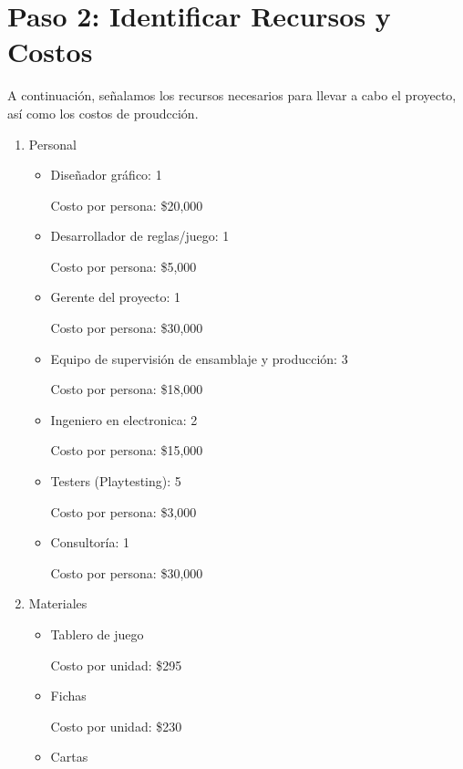 \documentclass[12pt]{article}
\begin{document}
 \section*{Paso 2: Identificar Recursos y Costos}


A continuación, señalamos los recursos necesarios para llevar a cabo el proyecto, así como los costos de proudcción.

\begin{enumerate}
	\item Personal

	\begin{itemize}
		\item Diseñador gráfico: 1 

		Costo por persona: \$20,000

		\item Desarrollador de reglas/juego: 1

		Costo por persona: \$5,000

		\item Gerente del proyecto: 1

		Costo por persona: \$30,000

		\item Equipo de supervisión de ensamblaje y producción:  3

		Costo por persona: \$18,000

		\item Ingeniero en electronica: 2

		Costo por persona: \$15,000

		\item Testers (Playtesting): 5

		Costo por persona: \$3,000

		\item Consultoría: 1

		Costo por persona: \$30,000

	\end{itemize}

	\item Materiales 

	\begin{itemize}
		\item Tablero de juego

		Costo por unidad: \$295

		\item Fichas

		Costo por unidad: \$230

		\item Cartas


\end{itemize}
\end{enumerate}
\end{document}
